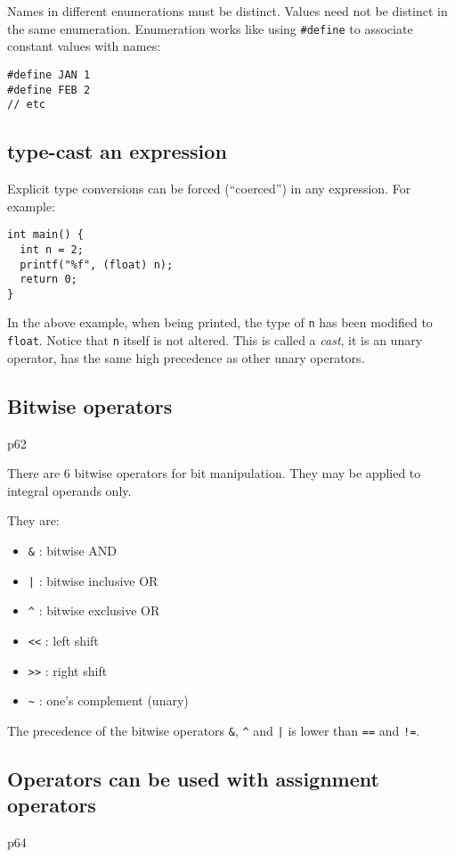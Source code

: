\documentclass[11pt]{article}
\begin{document}
Names in different enumerations must be distinct. Values need not be distinct in the same enumeration. Enumeration works like using \texttt{\#define} to associate constant values with names:
\begin{verbatim}
#define JAN 1
#define FEB 2
// etc
\end{verbatim}
\subsection{type-cast an expression}
\label{sec:org2226a82}
Explicit type conversions can be forced (``coerced'') in any expression. For example:
\begin{verbatim}
int main() {
  int n = 2;
  printf("%f", (float) n);
  return 0;
}
\end{verbatim}
In the above example, when being printed, the type of \texttt{n} has been modified to \texttt{float}. Notice that \texttt{n} itself is not altered. This is called a \emph{cast}, it is an unary operator, has the same high precedence as other unary operators.
\subsection{Bitwise operators}
\label{sec:org85261ec}
p62

There are 6 bitwise operators for bit manipulation. They may be applied to integral operands only.

They are:
\begin{itemize}
\item \texttt{\&}  : bitwise AND
\item \texttt{|}  : bitwise inclusive OR
\item \texttt{\textasciicircum{}}  : bitwise exclusive OR
\item \texttt{<<} : left shift
\item \texttt{>>} : right shift
\item \texttt{\textasciitilde{}}  : one's complement (unary)
\end{itemize}

The precedence of the bitwise operators \texttt{\&}, \texttt{\textasciicircum{}} and \texttt{|} is lower than \texttt{==} and \texttt{!=}.
\subsection{Operators can be used with assignment operators}
\label{sec:orgbc5319d}
p64
\end{document}
